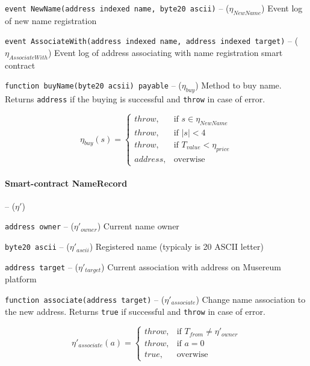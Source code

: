 \documentclass[12pt]{report}
\newcommand{\hlc}[1]{\colorbox{white!25}{#1}}
\def\code#1{\colorbox{light-gray}{\texttt{#1}}}
\begin{document}
\code{event NewName(address indexed name, byte20 ascii)} – ($\eta_{NewName}$)\hfill\null\linebreak
\hlc{Event log} of new name registration

\code{event AssociateWith(address indexed name, address indexed target)} – ($\eta_{AssociateWith}$)\hfill\null\linebreak
Event log of address associating with name registration smart contract

\code{function buyName(byte20 acsii) payable} – ($\eta_{buy}$)\hfill\null\linebreak
Method to buy name. Returns \code{address} if the buying is successful and \code{throw} in case of error.

\begin{equation}
\eta_{buy}(s) = \begin{cases}
	throw, & \text{if } s \in \eta_{NewName} \\ 
	throw, & \text{if } |s| < 4 \\
	throw, & \text{if } T_{value} < \eta_{price} \\
	address, & \text{overwise}
\end{cases}
\end{equation}

\paragraph{Smart-contract NameRecord}– ($\eta'$)

\code{address owner} – ($\eta'_{owner}$)\hfill\null\linebreak
Current name owner

\code{byte20 ascii} – ($\eta'_{ascii}$)\hfill\null\linebreak
Registered name (typicaly is 20 ASCII letter)

\code{address target} – ($\eta'_{target}$)\hfill\null\linebreak
Current association with address on Musereum platform

\code{function associate(address target)} – ($\eta'_{associate}$)\hfill\null\linebreak
Change name association to the new address. Returns \code{true} if successful and \code{throw} in case of error.
 
\begin{equation}
\eta'_{associate}(a) = \begin{cases}
	throw, & \text{if } T_{from} \neq \eta'_{owner} \\
	throw, & \text{if } a = 0 \\
	true, & \text{overwise}
\end{cases}
\end{equation}
\end{document}
